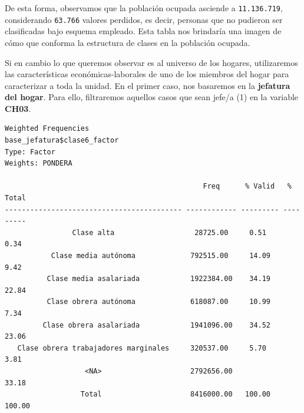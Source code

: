 \documentclass[
]{article}
\newenvironment{Shaded}{\begin{snugshade}}{\end{snugshade}}
\newcommand{\AttributeTok}[1]{\textcolor[rgb]{0.13,0.29,0.53}{#1}}
\newcommand{\CommentTok}[1]{\textcolor[rgb]{0.56,0.35,0.01}{\textit{#1}}}
\newcommand{\ConstantTok}[1]{\textcolor[rgb]{0.56,0.35,0.01}{#1}}
\newcommand{\DecValTok}[1]{\textcolor[rgb]{0.00,0.00,0.81}{#1}}
\newcommand{\FunctionTok}[1]{\textcolor[rgb]{0.13,0.29,0.53}{\textbf{#1}}}
\newcommand{\NormalTok}[1]{#1}
\newcommand{\OtherTok}[1]{\textcolor[rgb]{0.56,0.35,0.01}{#1}}
\newcommand{\SpecialCharTok}[1]{\textcolor[rgb]{0.81,0.36,0.00}{\textbf{#1}}}
\newcommand{\StringTok}[1]{\textcolor[rgb]{0.31,0.60,0.02}{#1}}
\begin{document}
De esta forma, observamos que la población ocupada asciende a \texttt{11.136.719}, considerando \texttt{63.766} valores perdidos, es decir, personas que no pudieron ser clasificadas bajo esquema empleado. Esta tabla nos brindaría una imagen de cómo que conforma la estructura de clases en la población ocupada.

Si en cambio lo que queremos observar es al universo de los hogares, utilizaremos las características económicas-laborales de uno de los miembros del hogar para caracterizar a toda la unidad. En el primer caso, nos basaremos en la \textbf{jefatura del hogar}. Para ello, filtraremos aquellos casos que sean jefe/a (1) en la variable \textbf{CH03}.

\begin{Shaded}
\end{Shaded}

\begin{verbatim}
Weighted Frequencies  
base_jefatura$clase6_factor  
Type: Factor  
Weights: PONDERA  

                                               Freq      % Valid   % Total 
------------------------------------------ ------------ --------- ---------
                Clase alta                   28725.00     0.51      0.34   
           Clase media autónoma             792515.00     14.09     9.42   
          Clase media asalariada            1922384.00    34.19     22.84  
          Clase obrera autónoma             618087.00     10.99     7.34   
         Clase obrera asalariada            1941096.00    34.52     23.06  
   Clase obrera trabajadores marginales     320537.00     5.70      3.81   
                   <NA>                     2792656.00              33.18  
                  Total                     8416000.00   100.00    100.00  
\end{verbatim}
\end{document}
